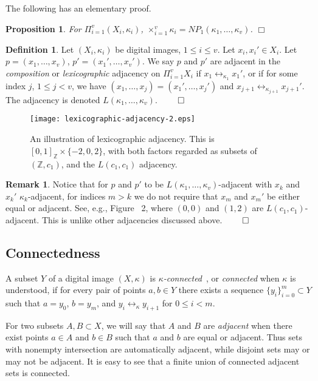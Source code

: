 \documentclass{article}
\theoremstyle{plain}
\newtheorem{prop}[thm]{Proposition}
\theoremstyle{definition}
\newtheorem{definition}[thm]{Definition}
\newtheorem{remark}[thm]{Remark}
\numberwithin{thm}{section}
\newcommand{\adj}{\leftrightarrow}
\def\Z{{\mathbb Z}}
\begin{document}
The following has an elementary proof.

\begin{prop}
\label{CartesianAndNP}
For $\Pi_{i=1}^v (X_i,\kappa_i)$,
$\times_{i=1}^v \kappa_i = NP_1(\kappa_1,\ldots,\kappa_v)$. $\Box$
\end{prop}

\begin{definition}
\label{lexico}
\rm{\cite{Harary}}
Let $(X_i,\kappa_i)$ be digital images,
$1 \le i \le v$. Let $x_i, x_i' \in X_i$.
Let $p=(x_1,\ldots,x_v)$,
$p'=(x_1',\ldots,x_v')$.
We say $p$ and $p'$ are adjacent in
the {\em composition} or {\em lexicographic} adjacency on $\Pi_{i=1}^v X_i$ if $x_1 \adj_{\kappa_1} x_1'$, or if for some
index $j$, $1 \le j < v$, we have
$(x_1,\ldots, x_j) = (x_1',\ldots,x_j')$
and $x_{j+1} \adj_{\kappa_{j+1}} x_{j+1}'$. The
adjacency is denoted
$L(\kappa_1,\ldots,\kappa_v)$. $\qed$
\end{definition}

\begin{figure}
\texttt{[image: lexicographic-adjacency-2.eps]}
\label{lex-adj-fig}
\caption{An illustration of lexicographic adjacency. This is
$[0,1]_{\Z} \times \{-2,0,2\}$, with
both factors regarded as subsets
of $(\Z,c_1)$, and
the $L(c_1,c_1)$ adjacency.}
\end{figure}

\begin{remark}
\label{gaps-allowed}
Notice that for $p$ and $p'$ to be
$L(\kappa_1,\ldots,\kappa_v)$-adjacent
with $x_k$ and $x_k'$ $\kappa_k$-adjacent, for indices
$m>k$ we do not require that
$x_m$ and $x_m'$ be either
equal or adjacent. See, e.g.,
Figure~%
2,
where $(0,0)$ and $(1,2)$ are $L(c_1,c_1)$-adjacent.
This is unlike
other adjacencies discussed above.
$\qed$
\end{remark}

\subsection{Connectedness}
A subset $Y$ of a digital image $(X,\kappa)$ is
{\em $\kappa$-connected}~\cite{Rosenfeld},
or {\em connected} when $\kappa$
is understood, if for every pair of points $a,b \in Y$ there
exists a sequence $\{y_i\}_{i=0}^m \subset Y$ such that
$a=y_0$, $b=y_m$, and $y_i \adj_{\kappa} y_{i+1}$ for $0 \leq i < m$.

For two subsets $A,B\subset X$, we will say that $A$ and $B$ are \emph{adjacent} when there exist points $a\in A$ and $b\in B$ such that $a$ and $b$ are equal or adjacent. Thus sets with nonempty intersection are automatically adjacent, while disjoint sets may or may not be adjacent. It is easy to see that a finite union of connected adjacent sets is connected. 
\end{document}
